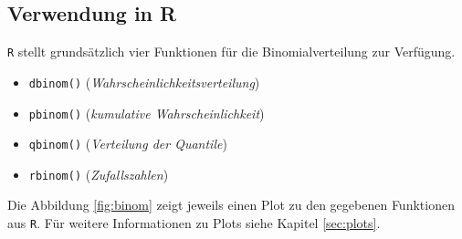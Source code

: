 \subsection{Verwendung in R}
\lstinline{R} stellt grundsätzlich vier Funktionen für die 
Binomialverteilung zur Verfügung. 
\begin{itemize}
	\item \lstinline{dbinom()} \hfill{} 
		(\emph{Wahrscheinlichkeitsverteilung})
	\item \lstinline{pbinom()} \hfill{}
		(\emph{kumulative Wahrscheinlichkeit})
	\item \lstinline{qbinom()} \hfill{}
		(\emph{Verteilung der Quantile})
	\item \lstinline{rbinom()} \hfill{}
		(\emph{Zufallszahlen})
\end{itemize}
Die Abbildung \ref{fig:binom} zeigt jeweils einen Plot zu den gegebenen
Funktionen aus \lstinline{R}. Für weitere Informationen zu Plots siehe
Kapitel \ref{sec:plots}.






